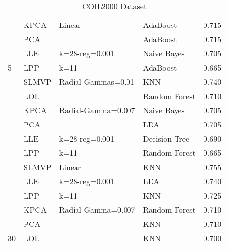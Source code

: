 \begin{table}
\begin{tabular}{llllr}
                                                 & KPCA           & Linear             & AdaBoost      & 0.715    \\
                                                 & PCA            &                    & AdaBoost      & 0.715    \\
                                                 & LLE            & k=28-reg=0.001     & Naive Bayes   & 0.705    \\
        \multirow{-6}{*}{5}                      & LPP            & k=11               & AdaBoost      & 0.665    \\
        \rowcolor{lightgray}                     & SLMVP          & Radial-Gammas=0.01 & KNN           & 0.740    \\
        \rowcolor{lightgray}                     & LOL            &                    & Random Forest & 0.710    \\
        \rowcolor{lightgray}                     & KPCA           & Radial-Gamma=0.007 & Naive Bayes   & 0.705    \\
        \rowcolor{lightgray}                     & PCA            &                    & LDA           & 0.705    \\
        \rowcolor{lightgray}                     & LLE            & k=28-reg=0.001     & Decision Tree & 0.690    \\
        \rowcolor{lightgray}\multirow{-6}{*}{15} & LPP            & k=11               & Random Forest & 0.665    \\
                                                 & SLMVP          & Linear             & KNN           & 0.755    \\
                                                 & LLE            & k=28-reg=0.001     & LDA           & 0.740    \\
                                                 & LPP            & k=11               & KNN           & 0.725    \\
                                                 & KPCA           & Radial-Gamma=0.007 & Random Forest & 0.710    \\
                                                 & PCA            &                    & KNN           & 0.710    \\
        \multirow{-6}{*}{30}                     & LOL            &                    & KNN           & 0.700    \\
        \bottomrule
    \end{tabular}
    \caption{COIL2000 Dataset}
    \label{annex-tab:coil-dataset}
\end{table}

